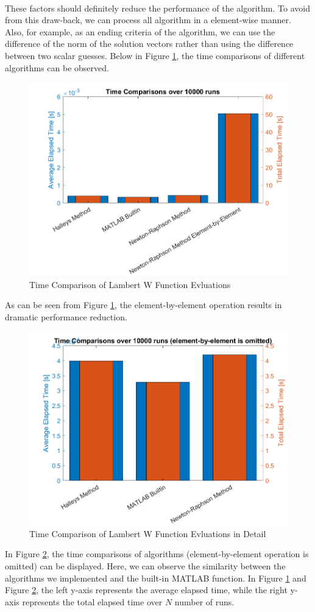 \documentclass[letterpaper,12pt]{article}
\begin{document}
\paragraph{} These factors should definitely reduce the performance of the algorithm. To avoid from this draw-back, we can process all algorithm in a element-wise manner. Also, for example, as an ending criteria of the algorithm, we can use the difference of the norm of the solution vectors rather than using the difference between two scalar guesses. Below in Figure \ref{fig:lamberttime}, the time comparisons of different algorithms can be observed.
\begin{figure}[H] 
   \centering \includegraphics[width=0.5\columnwidth]{figures/lamberttime.png}           
                  \caption{Time Comparison of Lambert W Function Evluations}                
                     \label{fig:lamberttime}
   \end{figure}
As can be seen from Figure \ref{fig:lamberttime}, the element-by-element operation results in dramatic performance reduction.
\begin{figure}[H] 
   \centering \includegraphics[width=0.7\columnwidth]{figures/lamberttimedetailed.png}           
                  \caption{Time Comparison of Lambert W Function Evluations in Detail}                
                     \label{fig:lamberttimedetailed}
   \end{figure}
   In Figure \ref{fig:lamberttimedetailed}, the time comparisons of algorithms (element-by-element operation is omitted) can be displayed. Here, we can observe the similarity between the algorithms we implemented and the built-in MATLAB function. In Figure \ref{fig:lamberttime} and Figure \ref{fig:lamberttimedetailed}, the left y-axis represents the average elapsed time, while the right y-axis represents the total elapsed time over $N$ number of runs.
\end{document}
